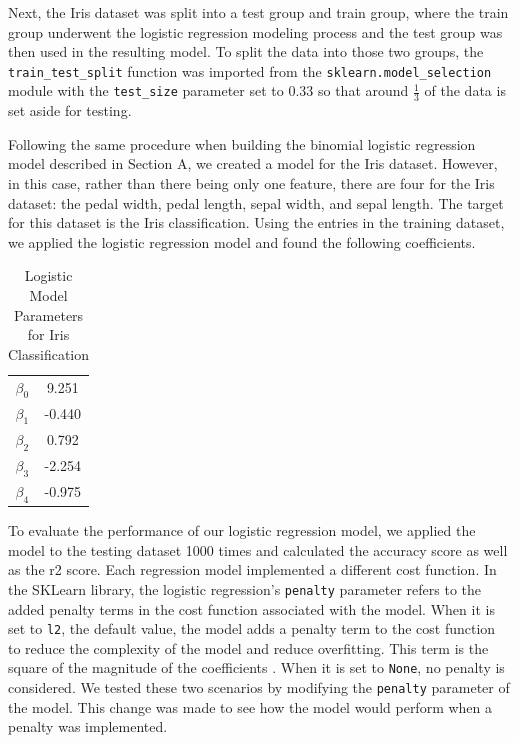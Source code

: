 \documentclass[journal]{IEEEtran}
\begin{document}
Next, the Iris dataset was split into a test group and train group, where the train group underwent the logistic regression modeling process and the test group was then used in the resulting model. To split the data into those two groups, the \lstinline{train_test_split} function was imported from the \lstinline{sklearn.model_selection} module with the \lstinline{test_size} parameter set to 0.33 so that around \(\frac{1}{3}\) of the data is set aside for testing.

Following the same procedure when building the binomial logistic regression model described in Section A, we created a model for the Iris dataset. However, in this case, rather than there being only one feature, there are four for the Iris dataset: the pedal width, pedal length, sepal width, and sepal length. The target for this dataset is the Iris classification. Using the entries in the training dataset, we applied the logistic regression model and found the following coefficients.

\begin{table}[h!]
    \centering
    \begin{tabular}{c | c}
        $\beta_0$ &  9.251 \\
        $\beta_1$ &  -0.440 \\
        $\beta_2$ &  0.792 \\
        $\beta_3$ &  -2.254 \\
        $\beta_4$ &  -0.975 
    \end{tabular}    
    \caption{Logistic Model Parameters for Iris Classification}
    \end{table}

To evaluate the performance of our logistic regression model, we applied the model to the testing dataset 1000 times and calculated the accuracy score as well as the r2 score. Each regression model implemented a different cost function. In the SKLearn library, the logistic regression's \lstinline{penalty} parameter refers to the added penalty terms in the cost function associated with the model. When it is set to \lstinline{l2}, the default value, the model adds a penalty term to the cost function to reduce the complexity of the model and reduce overfitting. This term is the square of the magnitude of the coefficients \cite{b4}. When it is set to \lstinline{None}, no penalty is considered. We tested these two scenarios by  modifying the \lstinline{penalty} parameter of the model. This change was made to see how the model would perform when a penalty was implemented. 
\end{document}
